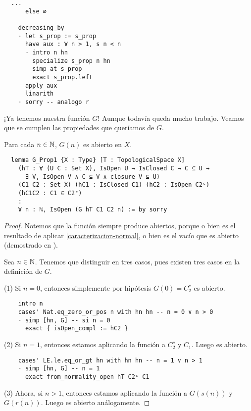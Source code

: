 \begin{lstlisting}
  ...
      else ∅

    decreasing_by
    · let s_prop := s_prop
      have aux : ∀ n > 1, s n < n
      · intro n hn
        specialize s_prop n hn
        simp at s_prop
        exact s_prop.left
      apply aux
      linarith
    · sorry -- analogo r
\end{lstlisting}

¡Ya tenemos nuestra función $G$! Aunque todavía queda mucho trabajo. Veamos que se cumplen las propiedades que queríamos de $G$.

\begin{lemma}
  Para cada $n \in \mathbb{N}$, $G(n)$ es abierto en $X$.
\end{lemma}

\begin{lstlisting}
  lemma G_Prop1 {X : Type} [T : TopologicalSpace X]
    (hT : ∀ (U C : Set X), IsOpen U → IsClosed C → C ⊆ U →
      ∃ V, IsOpen V ∧ C ⊆ V ∧ closure V ⊆ U)
    (C1 C2 : Set X) (hC1 : IsClosed C1) (hC2 : IsOpen C2ᶜ)
    (hC1C2 : C1 ⊆ C2ᶜ)
    :
    ∀ n : ℕ, IsOpen (G hT C1 C2 n) := by sorry
\end{lstlisting}

\begin{proof}
  Notemos que la función  siempre produce abiertos, porque o bien es el resultado de aplicar \ref{caracterizacion-normal}, o bien es el vacío que es abierto (demostrado en ).

  Sea $n \in \mathbb{N}$. Tenemos que distinguir en tres casos, pues existen tres casos en la definición de $G$.

  (1) Si $n = 0$, entonces simplemente por hipótesis $G(0) = C_2^c$ es abierto.

  \begin{lstlisting}
    intro n
    cases' Nat.eq_zero_or_pos n with hn hn -- n = 0 ∨ n > 0
    · simp [hn, G] -- si n = 0
      exact { isOpen_compl := hC2 }
  \end{lstlisting}

  (2) Si $n = 1$, entonces estamos aplicando la función  a $C_2^c$ y $C_1$. Luego es abierto.

  \begin{lstlisting}
    cases' LE.le.eq_or_gt hn with hn hn -- n = 1 ∨ n > 1
    · simp [hn, G] -- n = 1
      exact from_normality_open hT C2ᶜ C1 \end{lstlisting}

  (3) Ahora, si $n > 1$, entonces estamos aplicando la función  a $G(s(n))$ y $\overline{G(r(n))}$. Luego es abierto análogamente.
\end{proof}

